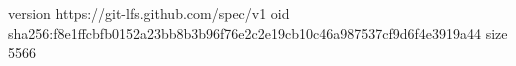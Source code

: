 version https://git-lfs.github.com/spec/v1
oid sha256:f8e1ffcbfb0152a23bb8b3b96f76e2c2e19cb10c46a987537cf9d6f4e3919a44
size 5566
